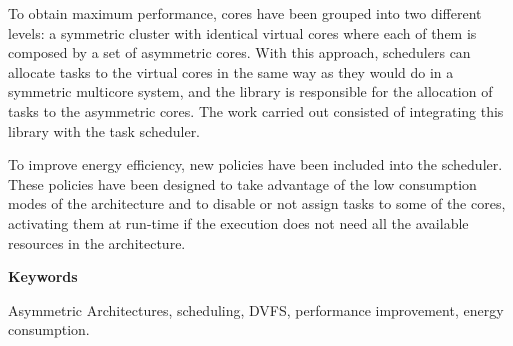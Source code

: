 To obtain maximum performance, cores have been grouped into two different
levels: a symmetric cluster with identical virtual cores where each of them
is composed by a set of asymmetric cores. With this approach, schedulers
can allocate tasks to the virtual cores in the same way as they would do in
a symmetric multicore system, and the library is responsible for the
allocation of tasks to the asymmetric cores. The work carried out consisted
of integrating this library with the task scheduler.


To improve energy efficiency, new policies have been included into the
scheduler. These policies have been designed to take advantage of the low
consumption modes of the architecture and to disable or not assign tasks to
some of the cores, activating them at run-time if the execution does not
need all the available resources in the architecture.


\begin{center}
  {\bf \Large Keywords}
  
\end{center}
{
\parindent=0in
Asymmetric Architectures, scheduling, DVFS, performance improvement, energy
consumption.
}



   


